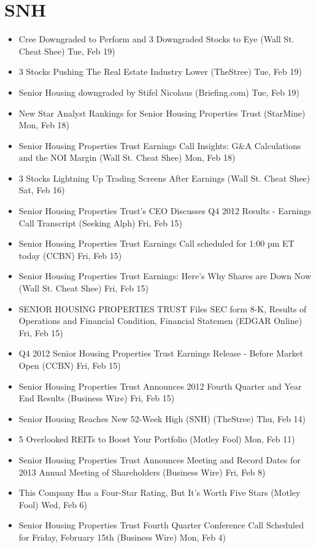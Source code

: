 \documentclass[11pt,asymmetric]{article}
\begin{document}
\section*{SNH}
\begin{itemize}
\item Cree Downgraded to Perform and 3 Downgraded Stocks to Eye (Wall St. Cheat Shee) Tue, Feb 19)
\item 3 Stocks Pushing The Real Estate Industry Lower (TheStree) Tue, Feb 19)
\item Senior Housing downgraded by Stifel Nicolaus (Briefing.com) Tue, Feb 19)
\item New Star Analyst Rankings for Senior Housing Properties Trust (StarMine) Mon, Feb 18)
\item Senior Housing Properties Trust Earnings Call Insights: G\&A Calculations and the NOI Margin (Wall St. Cheat Shee) Mon, Feb 18)
\item 3 Stocks Lightning Up Trading Screens After Earnings (Wall St. Cheat Shee) Sat, Feb 16)
\item Senior Housing Properties Trust's CEO Discusses Q4 2012 Results - Earnings Call Transcript (Seeking Alph) Fri, Feb 15)
\item Senior Housing Properties Trust Earnings Call scheduled for 1:00 pm ET today (CCBN) Fri, Feb 15)
\item Senior Housing Properties Trust Earnings: Here’s Why Shares are Down Now (Wall St. Cheat Shee) Fri, Feb 15)
\item SENIOR HOUSING PROPERTIES TRUST Files SEC form 8-K, Results of Operations and Financial Condition, Financial Statemen (EDGAR Online) Fri, Feb 15)
\item Q4 2012 Senior Housing Properties Trust Earnings Release - Before Market Open (CCBN) Fri, Feb 15)
\item Senior Housing Properties Trust Announces 2012 Fourth Quarter and Year End Results (Business Wire) Fri, Feb 15)
\item Senior Housing Reaches New 52-Week High (SNH) (TheStree) Thu, Feb 14)
\item 5 Overlooked REITs to Boost Your Portfolio (Motley Fool) Mon, Feb 11)
\item Senior Housing Properties Trust Announces Meeting and Record Dates for 2013 Annual Meeting of Shareholders (Business Wire) Fri, Feb 8)
\item This Company Has a Four-Star Rating, But It’s Worth Five Stars (Motley Fool) Wed, Feb 6)
\item Senior Housing Properties Trust Fourth Quarter Conference Call Scheduled for Friday, February 15th (Business Wire) Mon, Feb 4)

\end{itemize}
\end{document}
